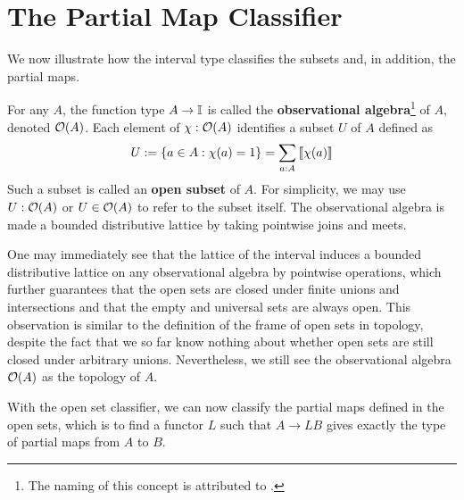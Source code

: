 \section{The Partial Map Classifier}
We now illustrate how the interval type classifies the subsets and, in addition, the partial maps.
\begin{definition}
    For any $A$, the function type $A\to\mathbb{I}$ is called the \textbf{observational algebra}\footnote{The naming of this concept is attributed to \cite{sterling_domains_2025}.} of $A$, denoted $\mathcal{O}(A)$. Each element of $\chi:\mathcal{O}(A)$ identifies a subset $U$ of $A$ defined as
    $$U:=\left\{a\in A:\chi(a)=1\right\}=\sum_{a:A}\left\llbracket\chi(a)\right\rrbracket$$
    Such a subset is called an \textbf{open subset} of $A$. For simplicity, we may use $U:\mathcal{O}(A)$ or $U\in\mathcal{O}(A)$ to refer to the subset itself. The observational algebra is made a bounded distributive lattice by taking pointwise joins and meets.
\end{definition}
One may immediately see that the lattice of the interval induces a bounded distributive lattice on any observational algebra by pointwise operations, which further guarantees that the open sets are closed under finite unions and intersections and that the empty and universal sets are always open. This observation is similar to the definition of the frame of open sets in topology, despite the fact that we so far know nothing about whether open sets are still closed under arbitrary unions. Nevertheless, we still see the observational algebra $\mathcal{O}(A)$ as the topology of $A$.

With the open set classifier, we can now classify the partial maps defined in the open sets, which is to find a functor $L$ such that $A\to LB$ gives exactly the type of partial maps from $A$ to $B$.

